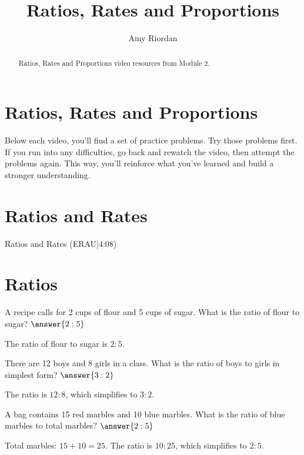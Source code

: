 \documentclass{ximera}
\title{Ratios, Rates and Proportions}
\author{Amy Riordan}
\begin{document}
\begin{abstract}
Ratios, Rates and Proportions video resources from Module 2.
\end{abstract}
\maketitle

\section*{Ratios, Rates and Proportions}

Below each video, you’ll find a set of practice problems. Try those problems first. If you run into any difficulties, go back and rewatch the video, then attempt the problems again. This way, you’ll reinforce what you’ve learned and build a stronger understanding.

\section*{Ratios and Rates}

Ratios and Rates (ERAU|4:08)



\section*{Ratios}

\begin{problem}
A recipe calls for 2 cups of flour and 5 cups of sugar. What is the ratio of flour to sugar? $\answer{2:5}$
\begin{feedback}
The ratio of flour to sugar is $2:5$.
\end{feedback}
\end{problem}

\begin{problem}
There are 12 boys and 8 girls in a class. What is the ratio of boys to girls in simplest form? $\answer{3:2}$
\begin{feedback}
The ratio is $12:8$, which simplifies to $3:2$.
\end{feedback}
\end{problem}

\begin{problem}
A bag contains 15 red marbles and 10 blue marbles. What is the ratio of blue marbles to total marbles?  $\answer{2:5}$
\begin{feedback}
Total marbles: $15 + 10 = 25$. The ratio is $10:25$, which simplifies to $2:5$.
\end{feedback}
\end{problem}
\end{document}
